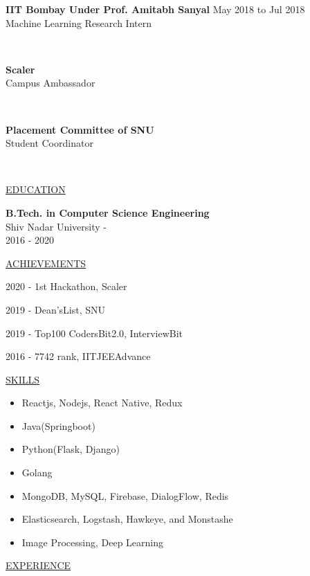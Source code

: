 \documentclass[11pt]{article}
\newcommand{\betteruline}[1]{
    \uline{#1}
}
\newcommand{\sectiontitle}[1]{
    \begingroup
        \titlebold
        \betteruline{\Large\uppercase{#1}  }
        \vspace{1.7mm}
    \endgroup
}
\newcommand{\sectioncontent}[1]{
    \begingroup
        \begin{FlushLeft}
        \vspace{-3mm}
        \sffamily\small#1
        \end{FlushLeft}
    \endgroup
    \vspace{2mm}
}
\newcommand{\job}[4]{
    \begingroup
        \textbf{\small#1}
        \hfill\color{black!70}\small{#3}
        \\
        \small#2
        \hfill\color{black!70}\small{#4}
    \endgroup
}
\newcommand{\spacevv}{
    \vspace{2mm}
}
\newcommand{\honor}[2]{
    \textcolor{black!70}{#1} - #2 \\
    \vspace{1.5mm}
}
\begin{document}
\begin{paracol}{2}
{      \job{IIT Bombay Under Prof. Amitabh Sanyal}{Machine Learning Research Intern}{May 2018 to Jul 2018}{}
      \\
      \spacevv
      \job{Scaler}{Campus Ambassador}{}{}
      \\
      \spacevv
      \job{Placement Committee of SNU}{Student Coordinator}{}{}
      \\
      \spacevv
    }

    \sectiontitle{education}
    \sectioncontent{
        \textbf{B.Tech. in Computer Science Engineering} \\
        Shiv Nadar University - \\
        \textcolor{black!70}{2016 - 2020} \\
    }

    \sectiontitle{Achievements}
    \sectioncontent{
        \honor{2020}{1st Hackathon, Scaler}
        \honor{2019}{Dean’sList, SNU}
        \honor{2019}{Top100 CodersBit2.0, InterviewBit}
        \honor{2016}{7742 rank, IITJEEAdvance}
    }
    

    \switchcolumn

    \sectiontitle{skills}
    \sectioncontent{
        \begin{itemize}
        \item \color{black!70}\small{Reactjs, Nodejs, React Native, Redux}
        \item \color{black!70}\small{Java(Springboot)}
        \item \color{black!70}\small{Python(Flask, Django)}
        \item \color{black!70}\small{Golang}
        \item \color{black!70}\small{MongoDB, MySQL, Firebase, DialogFlow, Redis}
        \item \color{black!70}\small{Elasticsearch, Logstash, Hawkeye, and Monstashe}
        \item \color{black!70}\small{Image Processing, Deep Learning}
        \end{itemize}
    }

    \sectiontitle{experience}
    \sectioncontent{

}
\end{paracol}
\end{document}
